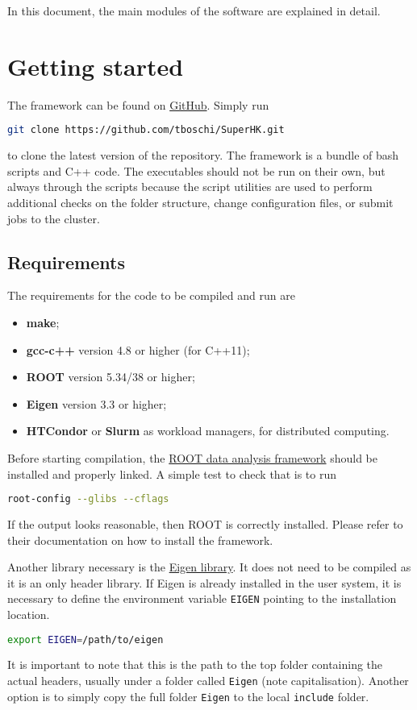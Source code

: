 \documentclass[a4paper, 11pt]{article}
\begin{document}
In this document, the main modules of the software are explained in detail.


\section{Getting started}

The framework can be found on \href{https://github.com/tboschi/SuperHK}{GitHub}.
Simply run
\begin{lstlisting}[language=bash]
	git clone https://github.com/tboschi/SuperHK.git
\end{lstlisting}
to clone the latest version of the repository.
The framework is a bundle of bash scripts and C++ code.
The executables should not be run on their own, but always through the scripts %
because the script utilities are used to perform additional checks on the folder structure, %
change configuration files, or submit jobs to the cluster.

\subsection{Requirements}

The requirements for the code to be compiled and run are
\begin{itemize}
		\small
	\item \textbf{make};
	\item \textbf{gcc-c++} version 4.8 or higher (for C++11);
	\item \textbf{ROOT} version 5.34/38 or higher;
	\item \textbf{Eigen} version 3.3 or higher;
	\item \textbf{HTCondor} or \textbf{Slurm} as workload managers, for distributed computing.
\end{itemize}

Before starting compilation, the \href{https://root.cern.ch/}{ROOT data analysis framework} %
should be installed and properly linked.
A simple test to check that is to run
\begin{lstlisting}[language=bash]
	root-config --glibs --cflags
\end{lstlisting}
If the output looks reasonable, then ROOT is correctly installed.
Please refer to their documentation on how to install the framework.

Another library necessary is the \href{http://eigen.tuxfamily.org/}{Eigen library}.
It does not need to be compiled as it is an only header library.
If Eigen is already installed in the user system, it is necessary to define the environment variable \texttt{EIGEN} %
pointing to the installation location.
\begin{lstlisting}[language=bash]
	export EIGEN=/path/to/eigen
\end{lstlisting}
It is important to note that this is the path to the top folder containing the actual headers, %
usually under a folder called \texttt{Eigen} (note capitalisation).
Another option is to simply copy the full folder \texttt{Eigen} to the local \texttt{include} folder.
\end{document}
